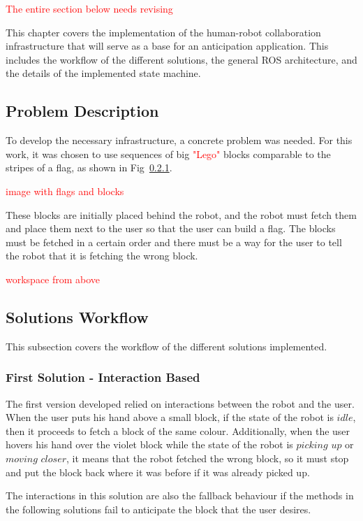 \textcolor{red}{The entire section below needs revising}

This chapter covers the implementation of the human-robot collaboration infrastructure that will serve as a base for an anticipation application. This includes the workflow of the different solutions, the general ROS architecture, and the details of the implemented state machine.

\subsection{Problem Description}

To develop the necessary infrastructure, a concrete problem was needed. For this work, it was chosen to use sequences of big \textcolor{red}{"Lego"} blocks comparable to the stripes of a flag, as shown in Fig~\ref{}.

\textcolor{red}{image with flags and blocks}

These blocks are initially placed behind the robot, and the robot must fetch them and place them next to the user so that the user can build a flag. The blocks must be fetched in a certain order and there must be a way for the user to tell the robot that it is fetching the wrong block.

\textcolor{red}{workspace from above}

\subsection{Solutions Workflow}

This subsection covers the workflow of the different solutions implemented.

\subsubsection{First Solution - Interaction Based}

The first version developed relied on interactions between the robot and the user. When the user puts his hand above a small block, if the state of the robot is $idle$, then it proceeds to fetch a block of the same colour. Additionally, when the user hovers his hand over the violet block while the state of the robot is $picking$ $up$ or $moving$ $closer$, it means that the robot fetched the wrong block, so it must stop and put the block back where it was before if it was already picked up.

The interactions in this solution are also the fallback behaviour if the methods in the following solutions fail to anticipate the block that the user desires.

